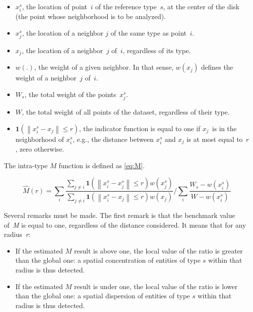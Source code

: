 \documentclass[fleqn,10pt]{latex/stylish_article} %
\providecommand{\tightlist}{%
  \setlength{\itemsep}{0pt}\setlength{\parskip}{0pt}}
\begin{document}
\begin{itemize}
\tightlist
\item
  \(x^s_i\), the location of point~\(i\) of the reference type~\(s\), at the center of the disk (the point whose neighborhood is to be analyzed).
\item
  \(x^s_j\), the location of a neighbor \(j\) of the same type as point~\(i\).
\item
  \(x_j\), the location of a neighbor~\(j\) of~\(i\), regardless of its type.
\item
  \(w(.)\), the weight of a given neighbor. In that sense, \(w(x_j)\) defines the weight of a neighbor~\(j\) of~\(i\).
\item
  \(W_s\), the total weight of the points~\(x^s_j\).
\item
  \(W\), the total weight of all points of the dataset, regardless of their type.
\item
  \({\mathbf 1} \left( \left\| x^s_i - x_j \right\| \le r \right)\), the indicator function is equal to one if \(x_j\)~is in the neighborhood of \(x^s_i\), e.g., the distance between \(x^s_i\) and \(x_j\) is at most equal to~\(r\), zero otherwise.
\end{itemize}

The intra-type \(M\) function is defined as \eqref{eq:M}.

\begin{equation} 
  \hat{M}\left(r\right) = {\sum_i{\frac{\sum_{j \ne i}{{\mathbf 1} \left( \left\| x^s_i - x^s_j \right\| \le r \right) w \left( x^s_j \right)}}{\sum_{j \ne i}{{\mathbf 1} \left( \left\| x^s_i - x_j \right\| \le r \right) w \left( x_j \right)}}}} / {\sum_i{\frac{W_s - w \left( x^s_i \right)}{W - w \left( x^s_i \right)}}}
\label{eq:M}
\end{equation}

Several remarks must be made.
The first remark is that the benchmark value of~\emph{M} is equal to one, regardless of the distance considered.
It means that for any radius~\emph{r}:

\begin{itemize}
\tightlist
\item
  If the estimated \(M\) result is above one, the local value of the ratio is greater than the global one: a spatial concentration of entities of type \(s\) within that radius is thus detected.
\item
  If the estimated \(M\) result is under one, the local value of the ratio is lower than the global one: a spatial dispersion of entities of type \(s\) within that radius is thus detected.
\end{itemize}
\end{document}
